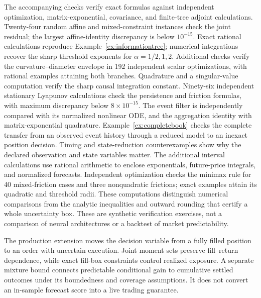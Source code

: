 \documentclass[11pt]{article}
\theoremstyle{plain}
\theoremstyle{definition}
\theoremstyle{remark}
\begin{document}
The accompanying checks verify exact formulas against independent
optimization, matrix-exponential, covariance, and finite-tree adjoint
calculations. Twenty-four random affine and mixed-constraint instances
check the joint residual; the largest affine-identity discrepancy is
below \(10^{-15}\). Exact rational calculations reproduce
Example~\ref{ex:informationtree}; numerical integrations recover the
sharp threshold exponents for \(\alpha=1/2,1,2\).
Additional checks verify the curvature--diameter envelope in 192
independent scalar optimizations, with rational examples attaining both
branches. Quadrature and a singular-value computation verify the sharp
causal integration constant. Ninety-six independent stationary
Lyapunov calculations check the persistence and friction formulas,
with maximum discrepancy below \(8\times10^{-15}\).
The event filter is independently compared with its normalized
nonlinear ODE, and the aggregation identity with matrix-exponential
quadrature. Example~\ref{ex:completebook} checks the complete transfer
from an observed event history through a reduced model to an
inexact position decision. Timing and state-reduction counterexamples
show why the declared observation and state variables matter.
The additional interval calculations use rational arithmetic to
enclose exponentials, future-price integrals, and normalized
forecasts. Independent optimization checks the minimax rule for
40 mixed-friction cases and three nonquadratic frictions;
exact examples attain its quadratic and threshold radii.
These computations distinguish numerical comparisons from the
analytic inequalities and outward rounding that certify a whole
uncertainty box.
These are synthetic verification exercises, not a comparison of neural
architectures or a backtest of market predictability.

The production extension moves the decision variable from a fully filled
position to an order with uncertain execution. Joint moment sets preserve
fill--return dependence, while exact fill-box constraints control realized
exposure. A separate mixture bound connects predictable conditional gain
to cumulative settled outcomes under its boundedness and coverage
assumptions. It does not convert an in-sample forecast score into a live
trading guarantee.

\setlength{\bibsep}{3pt plus 0.5pt minus 0.5pt}


\end{document}
